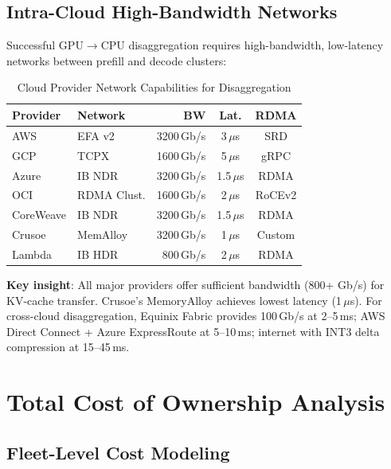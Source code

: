\documentclass[conference,10pt]{IEEEtran}
\begin{document}
\subsection{Intra-Cloud High-Bandwidth Networks}

Successful GPU$\to$CPU disaggregation requires high-bandwidth, low-latency networks between prefill and decode clusters:

\begin{table}[!htbp]
\caption{Cloud Provider Network Capabilities for Disaggregation}
\label{tab:network}
\centering\scriptsize
\begin{tabular}{@{}llrcc@{}}
\toprule
\textbf{Provider} & \textbf{Network} & \textbf{BW} & \textbf{Lat.} & \textbf{RDMA} \\
\midrule
AWS & EFA v2 & 3200\,Gb/s & 3\,$\mu$s & SRD \\
GCP & TCPX & 1600\,Gb/s & 5\,$\mu$s & gRPC \\
Azure & IB NDR & 3200\,Gb/s & 1.5\,$\mu$s & RDMA \\
OCI & RDMA Clust. & 1600\,Gb/s & 2\,$\mu$s & RoCEv2 \\
CoreWeave & IB NDR & 3200\,Gb/s & 1.5\,$\mu$s & RDMA \\
Crusoe & MemAlloy & 3200\,Gb/s & 1\,$\mu$s & Custom \\
Lambda & IB HDR & 800\,Gb/s & 2\,$\mu$s & RDMA \\
\bottomrule
\end{tabular}
\end{table}

\textbf{Key insight}: All major providers offer sufficient bandwidth (800+ Gb/s) for KV-cache transfer. Crusoe's MemoryAlloy achieves lowest latency (1\,$\mu$s). For cross-cloud disaggregation, Equinix Fabric provides 100\,Gb/s at 2--5\,ms; AWS Direct Connect + Azure ExpressRoute at 5--10\,ms; internet with INT3 delta compression at 15--45\,ms.

\section{Total Cost of Ownership Analysis}
\label{sec:tco}

\subsection{Fleet-Level Cost Modeling}
\end{document}
